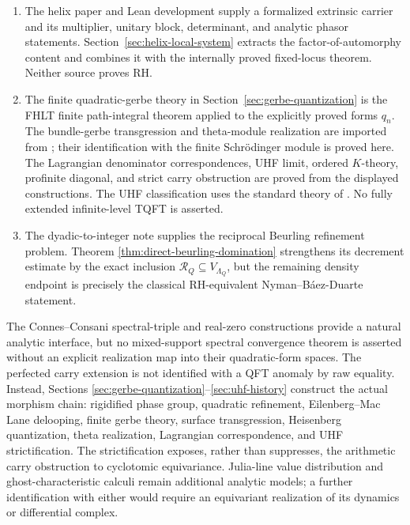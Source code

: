 \documentclass[11pt]{amsart}
\numberwithin{equation}{section}
\theoremstyle{definition}
\newcommand{\cR}{\mathcal R}
\begin{document}
\begin{enumerate}[label=\textup{(\arabic*)},leftmargin=3.2em]
\item The helix paper and Lean development \cite{Lavery} supply a formalized
extrinsic carrier and its multiplier, unitary block, determinant, and
analytic phasor statements.  Section~\ref{sec:helix-local-system} extracts
the factor-of-automorphy content and combines it with the internally proved
fixed-locus theorem.  Neither source proves RH.

\item The finite quadratic-gerbe theory in
Section~\ref{sec:gerbe-quantization} is the FHLT finite path-integral
theorem \cite{FHLT} applied to the explicitly proved forms $q_n$.  The
bundle-gerbe transgression and theta-module realization are imported from
\cite{GerbeTheta}; their identification with the finite Schr\"odinger
module is proved here.  The Lagrangian denominator correspondences, UHF
limit, ordered $K$-theory, profinite diagonal, and strict carry obstruction
are proved from the displayed constructions.  The UHF classification uses
the standard theory of \cite{GlimmUHF}.  No fully extended
infinite-level TQFT is asserted.

\item The dyadic-to-integer note \cite{Schultze} supplies the reciprocal
Beurling refinement problem.  Theorem
\ref{thm:direct-beurling-domination} strengthens its decrement estimate by
the exact inclusion $\cR_Q\subseteq V_{\Lambda_Q}$, but the remaining
density endpoint is precisely the classical RH-equivalent
Nyman--B\'aez-Duarte statement.
\end{enumerate}

The Connes--Consani spectral-triple and real-zero constructions provide a
natural analytic interface, but no mixed-support spectral convergence
theorem is asserted without an explicit realization map into their
quadratic-form spaces.  The perfected carry extension is not identified
with a QFT anomaly by raw equality.  Instead, Sections
\ref{sec:gerbe-quantization}--\ref{sec:uhf-history} construct the actual
morphism chain: rigidified phase group, quadratic refinement,
Eilenberg--Mac Lane delooping, finite gerbe theory, surface transgression,
Heisenberg quantization, theta realization, Lagrangian correspondence, and
UHF strictification.  The strictification exposes, rather than suppresses,
the arithmetic carry obstruction to cyclotomic equivariance.  Julia-line
value distribution and ghost-characteristic calculi remain additional
analytic models; a further identification with either would require an
equivariant realization of its dynamics or differential complex.
\end{document}
